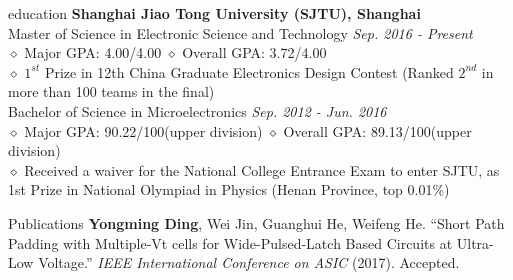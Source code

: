 \documentclass{resume} %
\begin{document}

\begin{rSection}{education}
\textbf{Shanghai Jiao Tong University (SJTU), Shanghai}
\\Master of Science in Electronic Science and Technology \hfill \emph{Sep. 2016 - Present}
\\$\diamond$ Major GPA: 4.00/4.00 \qquad  \qquad \qquad $\diamond$ Overall GPA: 3.72/4.00
\\$\diamond$ $1^{st}$ Prize in 12th China Graduate Electronics Design Contest (Ranked $2^{nd}$ in more than 100 teams in the final)
\\Bachelor of Science in Microelectronics \hfill \emph{Sep. 2012 - Jun. 2016}
\\$\diamond$ Major GPA: 90.22/100(upper division) \qquad$\diamond$ Overall GPA: 89.13/100(upper division)
\\$\diamond$ Received a waiver for the National College Entrance Exam to enter SJTU, as 1st Prize in National Olympiad in Physics (Henan Province, top 0.01$\%$)
\end{rSection}




\begin{rSection}{Publications}
\textbf{Yongming Ding}, Wei Jin, Guanghui He, Weifeng He. ``Short Path Padding with Multiple-Vt cells for Wide-Pulsed-Latch Based Circuits at Ultra-Low Voltage.'' \emph{IEEE International Conference on ASIC}  (2017). Accepted.
\end{rSection}
\end{document}
